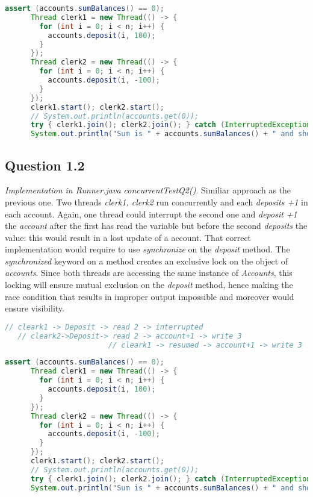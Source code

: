 \documentclass[format=acmsmall, review=false, screen=true]{acmart}
\begin{document}
\begin{lstlisting}[language=java]
      assert (accounts.sumBalances() == 0);
      Thread clerk1 = new Thread(() -> {
        for (int i = 0; i < n; i++) {
          accounts.deposit(i, 100);
        }
      });
      Thread clerk2 = new Thread(() -> {
        for (int i = 0; i < n; i++) {
          accounts.deposit(i, -100);
        }
      });
      clerk1.start(); clerk2.start();
      // System.out.println(accounts.get(0));
      try { clerk1.join(); clerk2.join(); } catch (InterruptedException exn) { }
      System.out.println("Sum is " + accounts.sumBalances() + " and should be " + 0);
\end{lstlisting}

\subsection{Question 1.2}

\textit{Implementation in Runner.java concurrentTestQ2(){}}. Similiar approach as the previous one. Two threads \emph{clerk1, clerk2} run concurrently and each \emph{deposits +1} in each account. Again, one thread could interrupt the second one and \emph{deposit +1} the \emph{account} after the first has read the variable but before the second \emph{deposits} the value: this would result in a lost update of a account. That correct implementation would require to use \emph{synchronize} on the \emph{deposit} method. The \emph{synchronized} keyword on a method creates an exclusive lock on the object of \emph{accounts}. Since both threads are accessing the same instance of \emph{Accounts}, this locking will ensure mutual exclusion on the \emph{deposit} method, hence making the race condition that results in improper output impossible and moreover would ensure visibility.

\begin{lstlisting}[language=java]
// cleark1 -> Deposit -> read 2 -> interrupted
   // cleark2->Deposit-> read 2 -> account+1 -> write 3
   						// cleark1 -> resumed -> account+1 -> write 3
\end{lstlisting}
	
\begin{lstlisting}[language=java]
      assert (accounts.sumBalances() == 0);
      Thread clerk1 = new Thread(() -> {
        for (int i = 0; i < n; i++) {
          accounts.deposit(i, 100);
        }
      });
      Thread clerk2 = new Thread(() -> {
        for (int i = 0; i < n; i++) {
          accounts.deposit(i, -100);
        }
      });
      clerk1.start(); clerk2.start();
      // System.out.println(accounts.get(0));
      try { clerk1.join(); clerk2.join(); } catch (InterruptedException exn) { }
      System.out.println("Sum is " + accounts.sumBalances() + " and should be " + 0);
\end{lstlisting}
\end{document}
